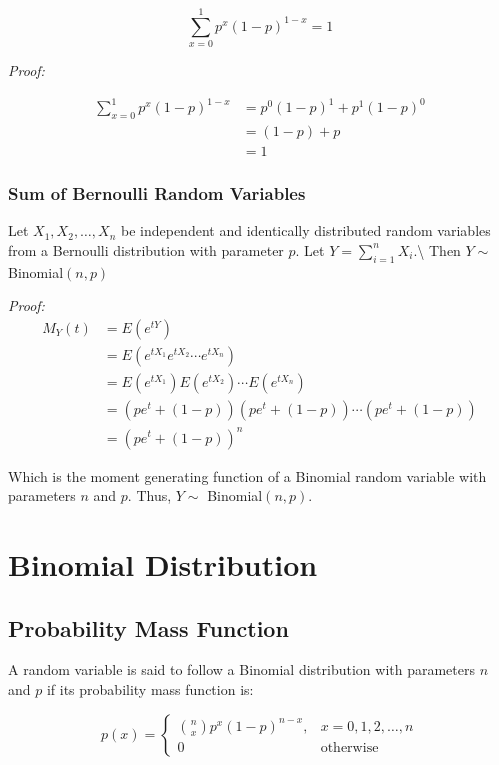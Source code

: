 \documentclass[]{book}
\begin{document}
\[\sum\limits_{x=0}^{1}p^x(1-p)^{1-x}=1\]

\emph{Proof:}

\[\begin{align*}
\sum\limits_{x=0}^{1} p^x (1-p)^{1-x}
    &= p^0 (1-p)^1 + p^1 (1-p)^0 \\
    &= (1-p) + p \\
    &= 1
\end{align*}\]

\subsection{Sum of Bernoulli Random
Variables}\label{sum-of-bernoulli-random-variables}

Let \(X_1,X_2,\ldots,X_n\) be independent and identically distributed
random variables from a Bernoulli distribution with parameter \(p\). Let
\(Y=\sum\limits_{i=1}^{n}X_i\).\textbackslash{} Then \(Y\sim\)
Binomial\((n,p)\)

\emph{Proof:} \[\begin{align*}
M_Y(t)
    &= E(e^{tY}) \\
    &= E(e^{tX_1} e^{tX_2} \cdots e^{tX_n}) \\
    &= E(e^{tX_1}) E(e^{tX_2}) \cdots E(e^{tX_n}) \\
  &= (pe^t+(1-p)) (pe^t+(1-p)) \cdots (pe^t+(1-p)) \\
    &= (pe^t+(1-p))^n
\end{align*}\]

Which is the moment generating function of a Binomial random variable
with parameters \(n\) and \(p\). Thus, \(Y\sim\) Binomial\((n,p)\).

\chapter{Binomial Distribution}\label{binomial-distribution}

\section{Probability Mass Function}\label{probability-mass-function-1}

A random variable is said to follow a Binomial distribution with
parameters \(n\) and \(p\) if its probability mass function is:

\[p(x)=
    \left\{
        \begin{array}{ll}
            {n \choose x} p^x (1-p)^{n-x},  & x=0,1,2,\ldots,n\\
            0               & \mathrm{otherwise}
        \end{array}
    \right. \]
\end{document}
